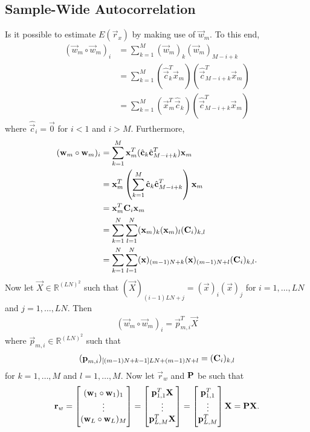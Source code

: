 \documentclass[a4paper, openany, oneside]{memoir}
\begin{document}
\subsection{Sample-Wide Autocorrelation}
Is it possible to estimate $E(\vec{r}_x)$ by making use of $\vec{w}_m$. To this end,
\begin{align*}
    (\vec{w}_m \circ \vec{w}_m)_i &= \sum_{k=1}^M (\vec{w}_m)_k (\vec{w}_m)_{M-i+k} \\
    &= \sum_{k=1}^M (\hat{\vec{c}}_k^T \vec{x}_m)(\hat{\vec{c}}_{M-i+k}^T \vec{x}_m) \\
    &= \sum_{k=1}^M (\vec{x}_m^T \hat{\vec{c}}_k)(\hat{\vec{c}}_{M-i+k}^T \vec{x}_m)
\end{align*}
where $\hat{\vec{c}}_i = \vec{0}$ for $i < 1$ and $i > M$. Furthermore,
\begin{align*}
    (\boldsymbol{\mathbf{w}}_m \circ \boldsymbol{\mathbf{w}}_m)_i &= \sum_{k=1}^M \boldsymbol{\mathbf{x}}_m^T (\hat{\boldsymbol{\mathbf{c}}}_k \hat{\boldsymbol{\mathbf{c}}}_{M-i+k}^T) \boldsymbol{\mathbf{x}}_m \\
    &= \boldsymbol{\mathbf{x}}_m^T\left(\sum_{k=1}^M  \hat{\boldsymbol{\mathbf{c}}}_k \hat{\boldsymbol{\mathbf{c}}}_{M-i+k}^T\right) \boldsymbol{\mathbf{x}}_m \\
    &= \boldsymbol{\mathbf{x}}_m^T \boldsymbol{\mathbf{C}}_i \boldsymbol{\mathbf{x}}_m \\
    &= \sum_{k = 1}^N \sum_{l=1}^N (\boldsymbol{\mathbf{x}}_m)_k (\boldsymbol{\mathbf{x}}_m)_l (\boldsymbol{\mathbf{C}}_i)_{k,l} \\
    &= \sum_{k = 1}^N \sum_{l=1}^N (\boldsymbol{\mathbf{x}})_{(m-1)N+k} (\boldsymbol{\mathbf{x}})_{(m-1)N+l} (\boldsymbol{\mathbf{C}}_i)_{k,l}.
\end{align*}
Now let $\vec{X} \in \mathbb{R}^{(LN)^2}$ such that $(\vec{X})_{(i-1)LN+j} = (\vec{x})_i (\vec{x})_j$ for $i = 1,\ldots,LN$ and $j = 1,\ldots,LN$. Then
\begin{align*}
    (\vec{w}_m \circ \vec{w}_m)_i = \vec{p}_{m,i}^T \vec{X}
\end{align*}
where $\vec{p}_{m,i} \in \mathbb{R}^{(LN)^2}$ such that
\begin{align*}
    (\boldsymbol{\mathbf{p}}_{m,i})_{[(m-1)N+k-1]LN+(m-1)N+l} = (\boldsymbol{\mathbf{C}}_i)_{k,l}
\end{align*}
for $k = 1,\ldots,M$ and $l = 1,\ldots,M$. Now let $\vec{r}_w$ and $\boldsymbol{\mathbf{P}}$ be such that
\begin{align*}
    \boldsymbol{\mathbf{r}}_w = \begin{bmatrix}
        (\boldsymbol{\mathbf{w}}_1 \circ \boldsymbol{\mathbf{w}}_1)_1 \\
        \vdots \\
        (\boldsymbol{\mathbf{w}}_L \circ \boldsymbol{\mathbf{w}}_L)_M
    \end{bmatrix} = \begin{bmatrix}
        \boldsymbol{\mathbf{p}}_{1,1}^T \boldsymbol{\mathbf{X}} \\
        \vdots \\
        \boldsymbol{\mathbf{p}}_{L,M}^T \boldsymbol{\mathbf{X}}
    \end{bmatrix} = \begin{bmatrix}
        \boldsymbol{\mathbf{p}}_{1,1}^T \\
        \vdots \\
        \boldsymbol{\mathbf{p}}_{L,M}^T
    \end{bmatrix} \boldsymbol{\mathbf{X}} = \boldsymbol{\mathbf{P}} \boldsymbol{\mathbf{X}}.
\end{align*}
\end{document}
